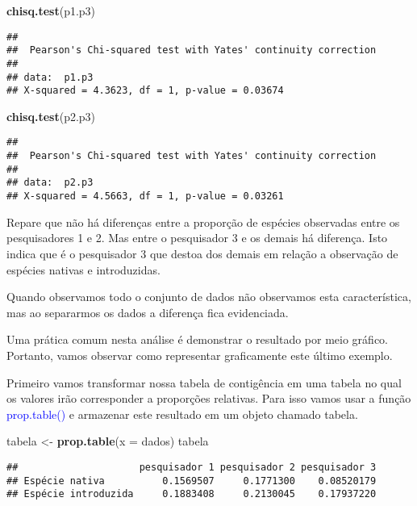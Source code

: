 \documentclass[14pt,titlepage, oneside, openany, a4paper]{book}
\newenvironment{Shaded}{\begin{snugshade}}{\end{snugshade}}
\newcommand{\DataTypeTok}[1]{\textcolor[rgb]{0.13,0.29,0.53}{#1}}
\newcommand{\KeywordTok}[1]{\textcolor[rgb]{0.13,0.29,0.53}{\textbf{#1}}}
\newcommand{\NormalTok}[1]{#1}
\newcommand{\StringTok}[1]{\textcolor[rgb]{0.31,0.60,0.02}{#1}}
\begin{document}
\begin{Shaded}
\begin{Highlighting}[]
\KeywordTok{chisq.test}\NormalTok{(p1.p3)}
\end{Highlighting}
\end{Shaded}

\begin{verbatim}
## 
##  Pearson's Chi-squared test with Yates' continuity correction
## 
## data:  p1.p3
## X-squared = 4.3623, df = 1, p-value = 0.03674
\end{verbatim}

\begin{Shaded}
\begin{Highlighting}[]
\KeywordTok{chisq.test}\NormalTok{(p2.p3)}
\end{Highlighting}
\end{Shaded}

\begin{verbatim}
## 
##  Pearson's Chi-squared test with Yates' continuity correction
## 
## data:  p2.p3
## X-squared = 4.5663, df = 1, p-value = 0.03261
\end{verbatim}

Repare que não há diferenças entre a proporção de espécies observadas entre os pesquisadores 1 e 2. Mas entre o pesquisador 3 e os demais há diferença. Isto indica que é o pesquisador 3 que destoa dos demais em relação a observação de espécies nativas e introduzidas.

Quando observamos todo o conjunto de dados não observamos esta característica, mas ao separarmos os dados a diferença fica evidenciada.

Uma prática comum nesta análise é demonstrar o resultado por meio gráfico. Portanto, vamos observar como representar graficamente este último exemplo.

Primeiro vamos transformar nossa tabela de contigência em uma tabela no qual os valores irão corresponder a proporções relativas. Para isso vamos usar a função \textcolor{blue}{prop.table()} e armazenar este resultado em um objeto chamado tabela.

\begin{Shaded}
\begin{Highlighting}[]
\NormalTok{tabela <-}\StringTok{ }\KeywordTok{prop.table}\NormalTok{(}\DataTypeTok{x =}\NormalTok{ dados)}
\NormalTok{tabela}
\end{Highlighting}
\end{Shaded}

\begin{verbatim}
##                     pesquisador 1 pesquisador 2 pesquisador 3
## Espécie nativa          0.1569507     0.1771300    0.08520179
## Espécie introduzida     0.1883408     0.2130045    0.17937220
\end{verbatim}
\end{document}
